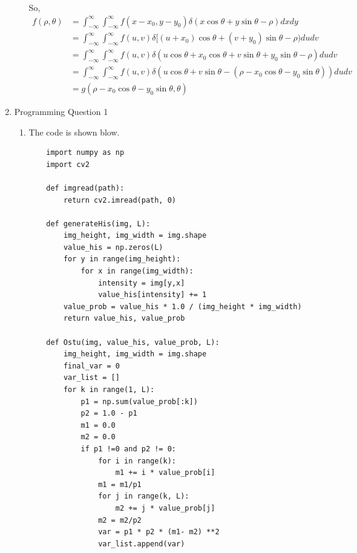 \documentclass[12pt]{article}
\begin{document}
\begin{enumerate}[leftmargin=\labelsep]
\begin{enumerate}
    So, 
    \begin{equation}
        \begin{aligned}
                f(\rho, \theta)
                &= \int_{-\infty}^{\infty}\int_{-\infty}^{\infty}f(x - x_0, y - y_0) \delta(x\cos\theta + y\sin\theta - \rho)dxdy\\
                &= \int_{-\infty}^{\infty}\int_{-\infty}^{\infty}f(u, v)\delta[(u + x_0)\cos\theta + (v + y_0)\sin\theta - \rho)dudv\\
                &= \int_{-\infty}^{\infty}\int_{-\infty}^{\infty}f(u, v)\delta(u\cos\theta + x_0\cos\theta + v\sin\theta + y_0\sin\theta - \rho)dudv\\
                &= \int_{-\infty}^{\infty}\int_{-\infty}^{\infty}f(u, v)\delta(u\cos\theta + v\sin\theta - (\rho - x_0\cos\theta - y_0\sin\theta))dudv\\
                &= g(\rho - x_0\cos\theta - y_0\sin\theta, \theta)
        \end{aligned}
    \end{equation}    

\end{enumerate}

\item Programming Question 1 
\begin{enumerate}
\item The code is shown blow.
\begin{lstlisting}
    import numpy as np
    import cv2

    def imgread(path):
        return cv2.imread(path, 0)

    def generateHis(img, L):
        img_height, img_width = img.shape
        value_his = np.zeros(L)
        for y in range(img_height):
            for x in range(img_width):
                intensity = img[y,x]
                value_his[intensity] += 1
        value_prob = value_his * 1.0 / (img_height * img_width)
        return value_his, value_prob

    def Ostu(img, value_his, value_prob, L):
        img_height, img_width = img.shape
        final_var = 0
        var_list = []
        for k in range(1, L):
            p1 = np.sum(value_prob[:k])
            p2 = 1.0 - p1
            m1 = 0.0
            m2 = 0.0
            if p1 !=0 and p2 != 0:
                for i in range(k):
                    m1 += i * value_prob[i]
                m1 = m1/p1
                for j in range(k, L):
                    m2 += j * value_prob[j]
                m2 = m2/p2
                var = p1 * p2 * (m1- m2) **2
                var_list.append(var)


\end{lstlisting}
\end{enumerate}
\end{enumerate}
\end{document}
